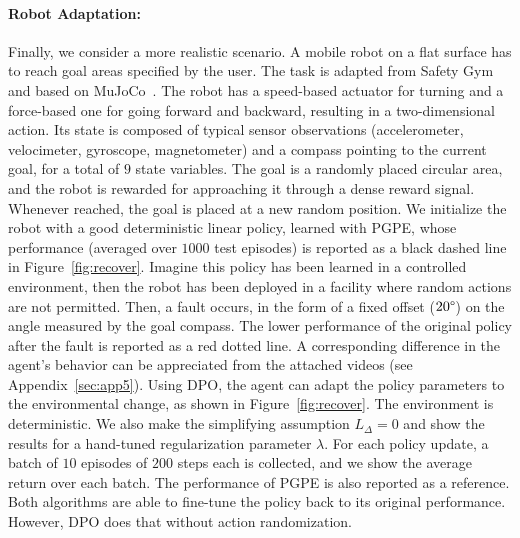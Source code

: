 \paragraph{Robot Adaptation:}
Finally, we consider a more realistic scenario. A mobile robot on a flat surface has to reach goal areas specified by the user. 
The task is adapted from Safety Gym~\citep{ray2019benchmarking} and based on MuJoCo~\citep{todorov2012mujoco}. The robot has a speed-based actuator for turning and a force-based one for going forward and backward, resulting in a two-dimensional action. Its state is composed of typical sensor observations (accelerometer, velocimeter, gyroscope, magnetometer) and a compass pointing to the current goal, for a total of $9$ state variables. The goal is a randomly placed circular area, and the robot is rewarded for approaching it through a dense reward signal. Whenever reached, the goal is placed at a new random position. We initialize the robot with a good deterministic linear policy, learned with PGPE, whose performance (averaged over $1000$ test episodes) is reported as a black dashed line in Figure~\ref{fig:recover}. Imagine this policy has been learned in a controlled environment, then the robot has been deployed in a facility where random actions are not permitted. Then, a fault occurs, in the form of a fixed offset ($20\degree$) on the angle measured by the goal compass. The lower performance of the original policy after the fault is reported as a red dotted line. A corresponding difference in the agent's behavior can be appreciated from the attached videos (see Appendix~\ref{sec:app5}). Using DPO, the agent can adapt the policy parameters to the environmental change, as shown in Figure~\ref{fig:recover}. The environment is deterministic. We also make the simplifying assumption $L_{\Delta}=0$ and show the results for a hand-tuned regularization parameter $\lambda$. For each policy update, a batch of $10$ episodes of $200$ steps each is collected, and we show the average return over each batch. The performance of PGPE is also reported as a reference. Both algorithms are able to fine-tune the policy back to its original performance. However, DPO does that without action randomization.

